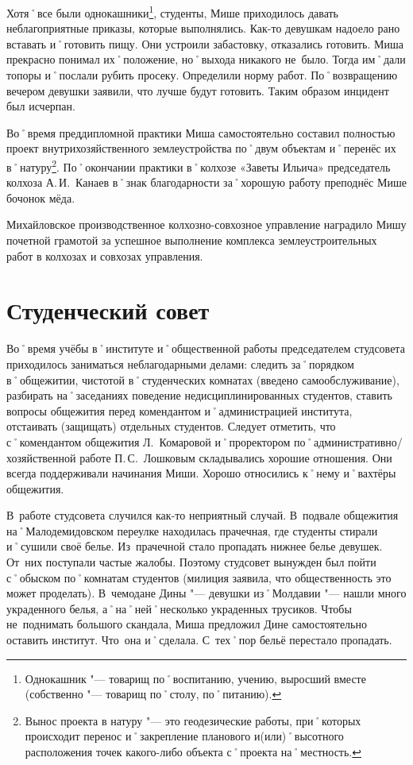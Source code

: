 Хотя˚все были однокашники\footnote{Однокашник "--- товарищ по˚воспитанию, учению, выросший вместе (собственно "--- товарищ по˚столу, по˚питанию).}, студенты, Мише приходилось давать неблагоприятные приказы, которые выполнялись. Как-то девушкам надоело рано вставать и˚готовить пищу. Они устроили забастовку, отказались готовить. Миша прекрасно понимал их˚положение, но˚выхода никакого не~было. Тогда им˚дали топоры и˚послали рубить просеку. Определили норму работ. По˚возвращению вечером девушки заявили, что лучше будут готовить. Таким образом инцидент был исчерпан. 

Во˚время преддипломной практики Миша самостоятельно составил полностью проект внутрихозяйственного землеустройства по˚двум объектам и˚перенёс их в˚натуру\footnote{Вынос проекта в натуру "--- это геодезические работы, при˚которых происходит перенос и˚закрепление планового и(или)˚высотного расположения точек какого-либо объекта с˚проекта на˚местность.}. По˚окончании практики в˚колхозе «Заветы Ильича» председатель колхоза А.\,И.~Канаев в˚знак благодарности за˚хорошую работу преподнёс Мише бочонок мёда.

Михайловское производственное колхозно-совхозное управление наградило Мишу почетной грамотой за успешное выполнение комплекса землеустроительных работ в колхозах и совхозах управления.


\section*{Студенческий совет}
\label{sec:studentCouncil}

Во˚время учёбы в˚институте и˚общественной работы председателем студсовета приходилось заниматься неблагодарными делами: следить за˚порядком в˚общежитии, чистотой в˚студенческих комнатах (введено самообслуживание), разбирать на˚заседаниях поведение недисциплинированных студентов, ставить вопросы общежития перед комендантом и˚администрацией института, отстаивать (защищать) отдельных студентов. Следует отметить, что с˚комендантом общежития Л.~Комаровой и˚проректором по˚административно\-/хозяйственной работе П.\,С.~Лошковым складывались хорошие отношения. Они всегда поддерживали начинания Миши. Хорошо относились к˚нему и˚вахтёры общежития.

В~работе студсовета случился как-то неприятный случай. В~подвале общежития на˚Малодемидовском переулке находилась прачечная, где студенты стирали и˚сушили своё белье. Из~прачечной стало пропадать нижнее белье девушек. От~них поступали частые жалобы. Поэтому студсовет вынужден был пойти с˚обыском по˚комнатам студентов (милиция заявила, что общественность это может проделать). В~чемодане Дины "--- девушки из˚Молдавии "--- нашли много украденного белья, а˚на˚ней˚несколько украденных трусиков. Чтобы не~поднимать большого скандала, Миша предложил Дине самостоятельно оставить институт. Что~она и˚сделала. С~тех˚пор бельё перестало пропадать.

